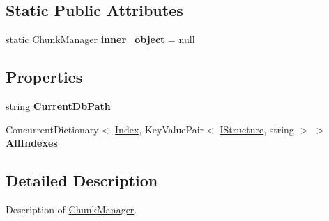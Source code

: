 \subsection*{Static Public Attributes}
\begin{DoxyCompactItemize}
\item 
\hypertarget{class_dwarf_d_b_1_1_chunk_manager_1_1_chunk_manager_a43d4aebedbb50fdfeb27840b3aa4849b}{
static \hyperlink{class_dwarf_d_b_1_1_chunk_manager_1_1_chunk_manager}{ChunkManager} {\bfseries inner\_\-object} = null}
\label{class_dwarf_d_b_1_1_chunk_manager_1_1_chunk_manager_a43d4aebedbb50fdfeb27840b3aa4849b}

\end{DoxyCompactItemize}
\subsection*{Properties}
\begin{DoxyCompactItemize}
\item 
\hypertarget{class_dwarf_d_b_1_1_chunk_manager_1_1_chunk_manager_ab3d1c419f8c1c396ca43368f5f214614}{
string {\bfseries CurrentDbPath}}
\label{class_dwarf_d_b_1_1_chunk_manager_1_1_chunk_manager_ab3d1c419f8c1c396ca43368f5f214614}

\item 
\hypertarget{class_dwarf_d_b_1_1_chunk_manager_1_1_chunk_manager_aea31cf7ac0a6f0ec20ca7087d8898550}{
ConcurrentDictionary$<$ \hyperlink{class_dwarf_d_b_1_1_data_structures_1_1_index}{Index}, KeyValuePair$<$ \hyperlink{interface_dwarf_d_b_1_1_data_structures_1_1_i_structure}{IStructure}, string $>$ $>$ {\bfseries AllIndexes}}
\label{class_dwarf_d_b_1_1_chunk_manager_1_1_chunk_manager_aea31cf7ac0a6f0ec20ca7087d8898550}

\end{DoxyCompactItemize}


\subsection{Detailed Description}
Description of \hyperlink{class_dwarf_d_b_1_1_chunk_manager_1_1_chunk_manager}{ChunkManager}. 


